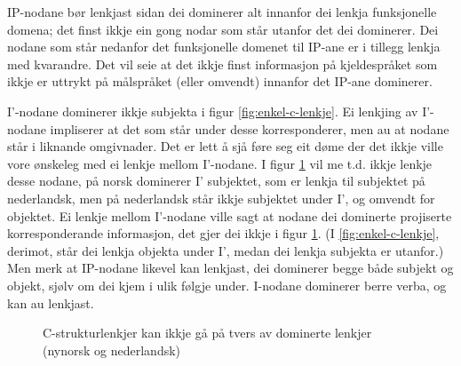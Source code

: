 \documentclass[11pt,a4paper,oneside,draft]{book}
\newcommand{\proj}[2]{\begin{tabular}{c}\footnotesize{#1}\\\normalsize{#2}\end{tabular}}
\newcommand{\ua}{\ensuremath{\uparrow}}
\newcommand{\da}{\ensuremath{\downarrow}}
\begin{document}
IP-nodane bør lenkjast sidan dei dominerer alt innanfor dei
lenkja funksjonelle domena; det finst ikkje ein gong nodar som står
utanfor det dei dominerer. Dei nodane som står nedanfor det funksjonelle
domenet til IP-ane er i tillegg lenkja med kvarandre. Det vil seie at
det ikkje finst informasjon på kjeldespråket som ikkje er uttrykt på
målspråket (eller omvendt) innanfor det IP-ane dominerer.

I'-nodane dominerer ikkje subjekta i figur
\ref{fig:enkel-c-lenkje}. Ei lenkjing av I'-nodane impliserer at det
som står under desse korresponderer, men au at nodane står i liknande
omgivnader. Det er lett å sjå føre seg eit døme der det ikkje ville
vore ønskeleg med ei lenkje mellom I'-nodane. I figur
\ref{fig:ikkje-c-lenkje} vil me t.d. ikkje lenkje desse nodane, på
norsk dominerer I' subjektet, som er lenkja til subjektet på
nederlandsk, men på nederlandsk står ikkje subjektet under I', og omvendt for
objektet. Ei lenkje mellom I'-nodane ville sagt at nodane dei
dominerte projiserte korresponderande informasjon, det gjer dei ikkje
i figur \ref{fig:ikkje-c-lenkje}. (I \ref{fig:enkel-c-lenkje}, derimot,
står dei lenkja objekta under I', medan dei lenkja subjekta er
utanfor.) Men merk at IP-nodane likevel kan lenkjast, dei dominerer
begge både subjekt og objekt, sjølv om dei kjem i ulik følgje under.
I-nodane dominerer berre verba, og kan au lenkjast.

\begin{figure}[htp]
\centering
   \caption{C-strukturlenkjer kan ikkje gå på tvers av dominerte
   lenkjer (nynorsk og nederlandsk)}
   \label{fig:ikkje-c-lenkje}
  \end{figure}
\end{document}

